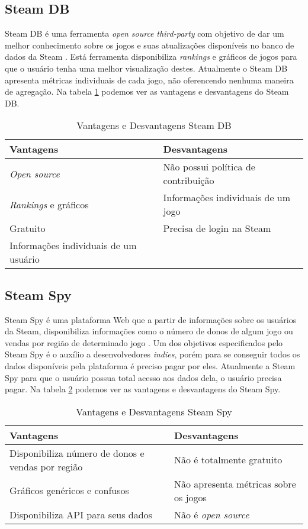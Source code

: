 \subsection{Steam DB}
Steam DB é uma ferramenta \textit{open source} \textit{third-party} com objetivo de dar um melhor conhecimento sobre os jogos e suas atualizações disponíveis no banco de dados da Steam \cite{steam_db}. Está ferramenta disponibiliza \textit{rankings} e gráficos de jogos para que o usuário tenha uma melhor visualização destes. Atualmente o Steam DB apresenta métricas individuais de cada jogo, não oferencendo nenhuma maneira de agregação. Na tabela \ref{table:steam_db} podemos ver as vantagens e desvantagens do Steam DB.
\begin{table} [H]
\centering
\begin{tabular}{|p{7cm}|p{7cm}|}
\hline \textbf{Vantagens} & \textbf{Desvantagens} \\
\hline \textit{Open source} & Não possui política de contribuição \\
\hline \textit{Rankings} e gráficos & Informações individuais de um jogo \\
\hline Gratuito & Precisa de login na Steam \\
\hline Informações individuais de um usuário & \\
\hline
\end{tabular}
\caption{Vantagens e Desvantagens Steam DB}
\label{table:steam_db}
\end{table}
\subsection{Steam Spy}
Steam Spy é uma plataforma Web que a partir de informações sobre os usuários da Steam, disponibiliza informações como o número de donos de algum jogo ou vendas por região de determinado jogo \cite{steam_spy}. Um dos objetivos especificados pelo Steam Spy é o auxílio a desenvolvedores \textit{indies}, porém para se conseguir todos os dados disponíveis pela plataforma é preciso pagar por eles. Atualmente a Steam Spy para que o usuário possua total acesso aos dados dela, o usuário precisa pagar. Na tabela \ref{table:steam_spy} podemos ver as vantagens e desvantagens do Steam Spy.
\begin{table} [H]
\centering
\begin{tabular}{|p{7cm}|p{7cm}|}
\hline \textbf{Vantagens} & \textbf{Desvantagens} \\
\hline Disponibiliza número de donos e vendas por região & Não é totalmente gratuito \\
\hline Gráficos genéricos e confusos & Não apresenta métricas sobre os jogos \\
\hline Disponibiliza API para seus dados & Não é \textit{open source} \\
\hline
\end{tabular}
\caption{Vantagens e Desvantagens Steam Spy}
\label{table:steam_spy}
\end{table}
